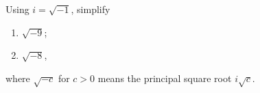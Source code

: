Using $i=\sqrt{-1}$, simplify
\begin{enumerate}
\item[(a)] $\sqrt{-9}$;
\item[(b)] $\sqrt{-8}$,
\end{enumerate}
where $\sqrt{-c}$ for $c>0$ means the principal square root $i\sqrt c$.
